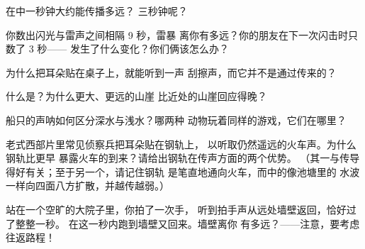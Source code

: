 \begin{exercise}[$\star$]\label{exo:g4:how-sound-travels:5}
在中一秒钟大约能传播多远？
三秒钟呢？
\end{exercise}

\begin{exercise}[$\star$]\label{exo:g4:how-sound-travels:6}
你数出闪光与雷声之间相隔 9 秒，雷暴
离你有多远？你的朋友在下一次闪击时只数了 3 秒——
发生了什么变化？你们俩该怎么办？
\end{exercise}

\begin{exercise}[$\star$]\label{exo:g4:how-sound-travels:7}
为什么把耳朵贴在桌子上，就能听到一声
刮擦声，而它并不是通过传来的？
\end{exercise}

\begin{exercise}[$\star$]\label{exo:g4:how-sound-travels:8}
什么是？为什么更大、更远的山崖
比近处的山崖回应得晚？
\end{exercise}

\begin{exercise}[$\star$]\label{exo:g4:how-sound-travels:9}
船只的声呐如何区分深水与浅水？哪两种
动物玩着同样的游戏，它们在哪里？
\end{exercise}

\begin{exercise}[$\star\star$]\label{exo:g4:how-sound-travels:10}
老式西部片里常见侦察兵把耳朵贴在钢轨上，
以听取仍然遥远的火车声。为什么钢轨比更早
暴露火车的到来？请给出钢轨在传声方面的两个优势。
（其一与传导得好有关；至于另一个，请记住钢轨
是笔直地通向火车，而中的像池塘里的
水波一样向四面八方扩散，并越传越弱。）
\end{exercise}

\begin{exercise}[$\star\star$]\label{exo:g4:how-sound-travels:11}
站在一个空旷的大院子里，你拍了一次手，
听到拍手声从远处墙壁返回，恰好过了整整一秒。
在这一秒内跑到墙壁又回来。墙壁离你
有多远？——注意，要考虑往返路程！
\end{exercise}
